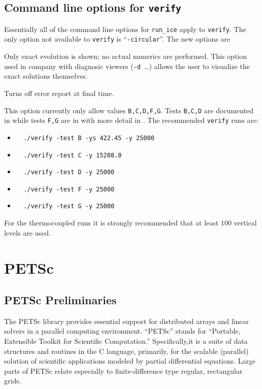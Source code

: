 \documentclass[final]{amsart}
\renewcommand{\t}[1]{\texttt{#1}}
\begin{document}
\subsection{Command line options for \t{verify}}  Essentially all of the command line options for \verb|run_ice| apply to \t{verify}.  The only option not available to \t{verify} is ``\t{-circular}''.  The new options are

  Only exact evolution is shown; no actual numerics are performed.  This option used in company with diagnosic viewers (\verb|-d |\dots) allows the user to visualize the exact solutions themselves.

  Turns off error report at final time.

  This option currently only allow values \t{B,C,D,F,G}.  Tests \t{B,C,D} are documented in \cite{BLKCB} while tests \t{F,G} are in \cite{BKL} with more detail in \cite{BK}.  The recommended \t{verify} runs are:\begin{itemize}
\item \verb|  ./verify -test B -ys 422.45 -y 25000|
\item \verb|  ./verify -test C -y 15208.0|
\item \verb|  ./verify -test D -y 25000|
\item \verb|  ./verify -test F -y 25000|
\item \verb|  ./verify -test G -y 25000|
\end{itemize}
For the thermocoupled runs it is strongly recommended that at least $100$ vertical levels are used.



\section{PETSc}

\subsection{PETSc Preliminaries}
The PETSc library \cite{petsc-web-page,petsc-user-ref,petsc-efficient} provides essential support for distributed arrays and linear solvers in a parallel computing environment.  ``PETSc'' stands for ``Portable, Extensible Toolkit for Scientific Computation.''  Specifically,it is a suite of data structures and routines in the C language, primarily, for the scalable (parallel) solution of scientific applications modeled by partial differential equations.  Large parts of PETSc relate especially to finite-difference type regular, rectangular grids.
\end{document}
